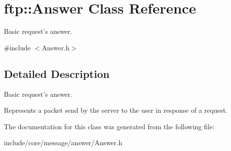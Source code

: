 \hypertarget{classftp_1_1_answer}{\section{ftp\-:\-:Answer Class Reference}
\label{classftp_1_1_answer}
}


Basic request's answer.  




{\ttfamily \#include $<$Answer.\-h$>$}



\subsection{Detailed Description}
Basic request's answer. 

Represents a packet send by the server to the user in response of a request. 

The documentation for this class was generated from the following file\-:\begin{DoxyCompactItemize}
\item 
include/core/message/answer/Answer.\-h\end{DoxyCompactItemize}
